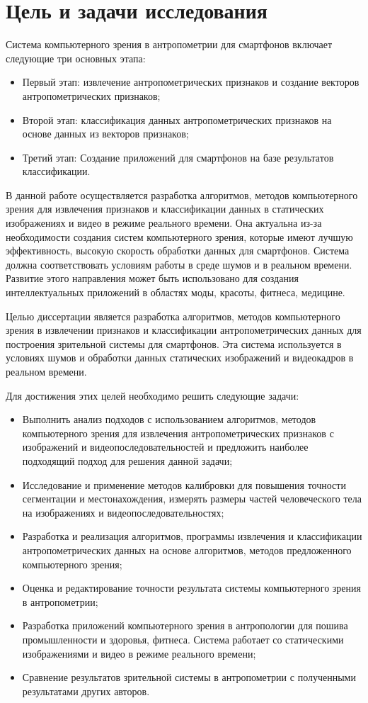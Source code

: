 \section{Цель и задачи исследования}

Система компьютерного зрения в антропометрии для смартфонов включает следующие три основных этапа:
\begin{itemize}
	\item Первый этап: извлечение антропометрических признаков и создание векторов антропометрических признаков;
	\item Второй этап: классификация данных антропометрических признаков на основе данных из векторов признаков;
	\item Третий этап: Создание приложений для смартфонов на базе результатов классификации.
\end{itemize}

В данной работе осуществляется разработка алгоритмов, методов компьютерного зрения для извлечения признаков и классификации данных в статических изображениях и видео в режиме реального времени. Она актуальна из-за необходимости создания систем компьютерного зрения, которые имеют лучшую эффективность, высокую скорость обработки данных для смартфонов. Система должна соответствовать условиям работы в среде шумов и в реальном времени. Развитие этого направления может быть использовано для создания интеллектуальных приложений в областях моды, красоты, фитнеса, медицине.

Целью диссертации является разработка алгоритмов, методов компьютерного зрения в извлечении признаков и классификации антропометрических данных для построения зрительной системы для смартфонов. Эта система используется в условиях шумов и обработки данных статических изображений и видеокадров в реальном времени.

Для достижения этих целей необходимо решить следующие задачи:

\begin{itemize}
	\item Выполнить анализ подходов с использованием алгоритмов, методов компьютерного зрения для извлечения антропометрических признаков с изображений и видеопоследовательностей и предложить наиболее подходящий подход для решения данной задачи;
	\item Исследование и применение методов калибровки для повышения точности сегментации и местонахождения, измерять размеры частей человеческого тела на изображениях и видеопоследовательностях;
	\item Разработка и реализация алгоритмов, программы извлечения и классификации антропометрических данных на основе алгоритмов, методов предложенного компьютерного зрения;
	\item Оценка и редактирование точности результата системы компьютерного зрения в антропометрии;
	\item Разработка приложений компьютерного зрения в антропологии для пошива промышленности и здоровья, фитнеса. Система работает со статическими изображениями и видео в режиме реального времени;
	\item Сравнение результатов зрительной системы в антропометрии с полученными результатами других авторов.
\end{itemize}